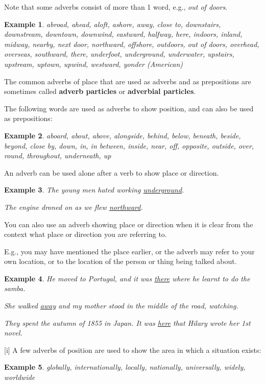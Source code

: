 \documentclass[oneside]{book}
\numberwithin{equation}{section}
\newtheorem{example}{Example}[section]
\begin{document}
Note that some adverbs consist of more than 1 word, e.g., \textit{out of doors}.
\begin{example}
    abroad, ahead, aloft, ashore, away, close to, downstairs, downstream, downtown, downwind, eastward, halfway, here, indoors, inland, midway, nearby, next door, northward, offshore, outdoors, out of doors, overhead, overseas, southward, there, underfoot, underground, underwater, upstairs, upstream, uptown, upwind, westward, yonder \emph{(American)}
\end{example}
The common adverbs of place that are used as adverbs and as prepositions are sometimes called \textbf{adverb particles} or \textbf{adverbial particles}.

The following words are used as adverbs to show position, and can also be used as prepositions:
\begin{example}
    aboard, about, above, alongside, behind, below, beneath, beside, beyond, close by, down, in, in between, inside, near, off, opposite, outside, over, round, throughout, underneath, up
\end{example}
%
\noindent{} An adverb can be used alone after a verb to show place or direction.
\begin{example}
    The young men hated working \underline{underground}.
    
    The engine droned on as we flew \underline{northward}.
\end{example}
You can also use an adverb showing place or direction when it is clear from the context what place or direction you are referring to.

E.g., you may have mentioned the place earlier, or the adverb may refer to your own location, or to the location of the person or thing being talked about.
\begin{example}
    He moved to Portugal, and it was \underline{there} where he learnt to do the samba.
    
    She walked \underline{away} and my mother stood in the middle of the road, watching.
    
    They spent the autumn of 1855 in Japan. It was \underline{here} that Hilary wrote her 1st novel.
\end{example}
%
\noindent{} [i] A few adverbs of position are used to show the area in which a situation exists:
\begin{example}
    globally, internationally, locally, nationally, universally, widely, worldwide
\end{example}
\end{document}
